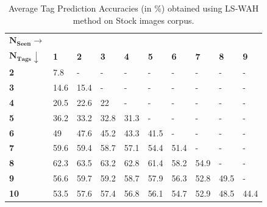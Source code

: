 \begin{table}[!htp]
\fontsize{8pt}{1em}\selectfont
\begin{center}
\caption{Average Tag Prediction Accuracies (in \%) obtained using LS-WAH method on Stock images corpus.}
\label{tab:TPGWS30LSWAH}
\begin{tabular}{|p{1.5cm}|p{0.5cm}|p{0.5cm}|p{0.5cm}|p{0.5cm}|p{0.5cm}|p{0.5cm}|p{0.5cm}|p{0.5cm}|p{0.5cm}|}
		\hline
		{$\boldsymbol{N_{Seen} \rightarrow}$} & &  &  &  & &  &  &  &\\ 
		{$\boldsymbol{N_{Tags}}\downarrow $} & \textbf{1} & \textbf{2} & \textbf{3} & \textbf{4} & \textbf{5}  & \textbf{6} & \textbf{7} & \textbf{8} & \textbf{9} \\ 
		\hline 		
		\textbf{2} & 7.8&-&-&-&-&-&-&-&- \\
		\hline
		\textbf{3} & 14.6&15.4&-&-&-&-&-&-&- \\
		\hline
		\textbf{4} & 20.5&22.6&22&-&-&-&-&-&- \\
		\hline
		\textbf{5} & 36.2&33.2&32.8&31.3&-&-&-&-&- \\
		\hline
		\textbf{6} & 49&47.6&45.2&43.3&41.5&-&-&-&- \\
		\hline
		\textbf{7} & 59.6&59.4&58.7&57.1&54.4&51.4&-&-&- \\
		\hline
		\textbf{8} & 62.3&63.5&63.2&62.8&61.4&58.2&54.9&-&- \\
		\hline
		\textbf{9} & 56.6&59.7&59.2&58.7&57.9&56.3&52.8&49.5&- \\
		\hline
		\textbf{10} & 53.5&57.6&57.4&56.8&56.1&54.7&52.9&48.5&44.4 \\
		\hline
\end{tabular}
\vspace{-2.5mm}
\end{center}
\end{table}
